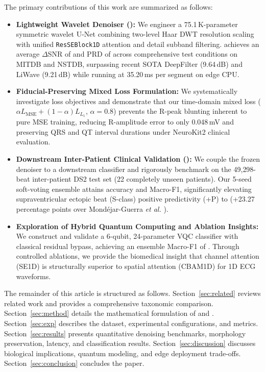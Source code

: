 The primary contributions of this work are summarized as follows:
\begin{itemize}
    \item \textbf{Lightweight Wavelet Denoiser (\HSL):} We engineer a 75.1\,K-parameter symmetric wavelet U-Net combining two-level Haar DWT resolution scaling with unified \texttt{ResSEBlock1D} attention and detail subband filtering. \HSL{} achieves an average $\Delta$SNR of  and PRD of  across comprehensive test conditions on MITDB and NSTDB, surpassing recent SOTA DeepFilter \cite{romero2021} (9.64\,dB) and LiWave \cite{nguyen2026liwave} (9.21\,dB) while running at 35.20\,ms per segment on edge CPU.
    \item \textbf{Fiducial-Preserving Mixed Loss Formulation:} We systematically investigate loss objectives and demonstrate that our time-domain mixed loss ($\alpha L_{\mathrm{MSE}} + (1-\alpha)L_{L_1}$, $\alpha=0.8$) prevents the R-peak blunting inherent to pure MSE training, reducing R-amplitude error to only 0.048\,mV and preserving QRS and QT interval durations under NeuroKit2 clinical evaluation.
    \item \textbf{Downstream Inter-Patient Clinical Validation (\RRN):} We couple the frozen denoiser to a downstream classifier and rigorously benchmark on the 49{,}298-beat inter-patient DS2 test set (22 completely unseen patients). Our 5-seed soft-voting ensemble attains  accuracy and  Macro-F1, significantly elevating supraventricular ectopic beat (S-class) positive predictivity (+P) to  (+23.27 percentage points over Mond{\'e}jar-Guerra \emph{et al.} \cite{mondejar2019}).
    \item \textbf{Exploration of Hybrid Quantum Computing and Ablation Insights:} We construct and validate a 6-qubit, 24-parameter VQC classifier with classical residual bypass, achieving an ensemble Macro-F1 of . Through controlled ablations, we provide the biomedical insight that channel attention (SE1D) is structurally superior to spatial attention (CBAM1D) for 1D ECG waveforms.
\end{itemize}

The remainder of this article is structured as follows. Section~\ref{sec:related} reviews related work and provides a comprehensive taxonomic comparison. Section~\ref{sec:method} details the mathematical formulation of \HSL{} and \RRN. Section~\ref{sec:exp} describes the dataset, experimental configurations, and metrics. Section~\ref{sec:results} presents quantitative denoising benchmarks, morphology preservation, latency, and classification results. Section~\ref{sec:discussion} discusses biological implications, quantum modeling, and edge deployment trade-offs. Section~\ref{sec:conclusion} concludes the paper.

